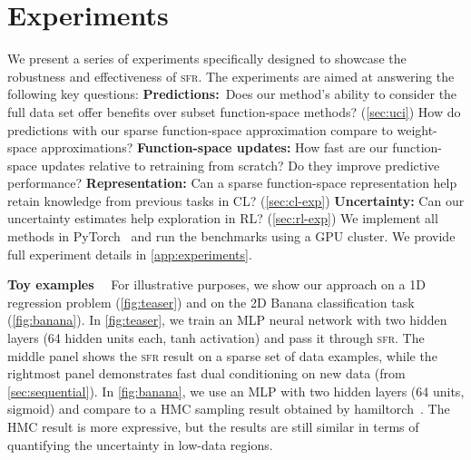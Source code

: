 \documentclass{article}
\renewcommand{\paragraph}[1]{{\bf #1}~~}
\newcommand{\our}{\textsc{sfr}\xspace}
\begin{document}
\section{Experiments}
\label{sec:experiments}
%
We present a series of experiments specifically designed to showcase the robustness and effectiveness of \our. The experiments are aimed at answering the following key questions:
\textbf{Predictions:}~Does our method's ability to consider the full data set offer benefits over subset function-space methods? (\cref{sec:uci}) How do predictions with our sparse function-space approximation compare to weight-space approximations? 
\textbf{Function-space updates:} How fast are our function-space updates relative to retraining from scratch? Do they improve predictive performance? 
\textbf{Representation:} Can a sparse function-space representation help retain knowledge from previous tasks in CL? (\cref{sec:cl-exp})
\textbf{Uncertainty:} Can our uncertainty estimates help exploration in RL? (\cref{sec:rl-exp}) We implement all methods in PyTorch~\cite{paszke2019pytorch} and run the benchmarks using a GPU cluster. We provide full experiment details in \cref{app:experiments}. 

\paragraph{Toy examples} For illustrative purposes, we show our approach on a 1D regression problem (\cref{fig:teaser}) and on the 2D {\sc Banana} classification task (\cref{fig:banana}). In \cref{fig:teaser}, we train an MLP neural network with two hidden layers (64 hidden units each, tanh activation) and pass it through \our. The middle panel shows the \our result on a sparse set of data examples, while the rightmost panel demonstrates fast dual conditioning on new data (from \cref{sec:sequential}). In \cref{fig:banana}, we use an MLP with two hidden layers (64 units, sigmoid) and compare to a HMC sampling result obtained by hamiltorch~\cite{cobb2020scaling}. The HMC result is more expressive, but the results are still similar in terms of quantifying the uncertainty in low-data regions.


\end{document}
